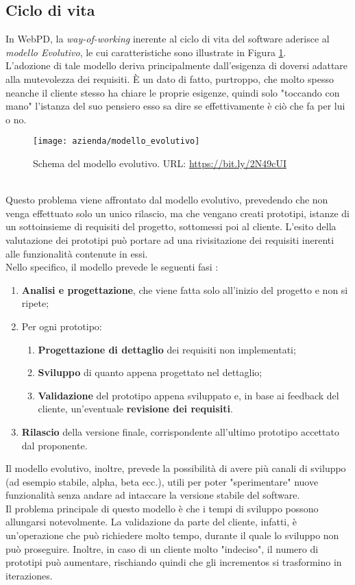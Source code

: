 \subsection{Ciclo di vita}
\label{sec:modello-evolutivo}
In WebPD, la \textit{way-of-working} inerente al ciclo di vita del software aderisce al \textit{modello Evolutivo}, le cui caratteristiche sono illustrate in Figura \ref{figura:modello-evolutivo}.\\
L'adozione di tale modello deriva principalmente dall'esigenza di doversi adattare alla mutevolezza dei requisiti. È un dato di fatto, purtroppo, che molto spesso neanche il cliente stesso ha chiare le proprie esigenze, quindi solo "toccando con mano" l'istanza del suo pensiero esso sa dire se effettivamente è ciò che fa per lui o no.\\
\begin{figure}[!h] 
	\centering 
	\texttt{[image: azienda/modello\_evolutivo]} 
	\caption{Schema del modello evolutivo. URL: \url{https://bit.ly/2N49cUI} }
	\label{figura:modello-evolutivo}
\end{figure}\\
Questo problema viene affrontato dal modello evolutivo, prevedendo che non venga effettuato solo un unico rilascio, ma che vengano creati prototipi, istanze di un sottoinsieme di requisiti del progetto, sottomessi poi al cliente. L'esito della valutazione dei prototipi può portare ad una rivisitazione dei requisiti inerenti alle funzionalità contenute in essi.\\
Nello specifico, il modello prevede le seguenti fasi :
\begin{enumerate}
	\item \textbf{Analisi e progettazione}, che viene fatta solo all'inizio del progetto e non si ripete;
	\item Per ogni prototipo:
		\begin{enumerate}
			\item \textbf{Progettazione di dettaglio} dei requisiti non implementati;
			\item \textbf{Sviluppo} di quanto appena progettato nel dettaglio;
			\item \textbf{Validazione} del prototipo appena sviluppato e, in base ai feedback del cliente, un'eventuale \textbf{revisione dei requisiti}.
		\end{enumerate}
	\item \textbf{Rilascio} della versione finale, corrispondente all'ultimo prototipo accettato dal proponente.
\end{enumerate}
Il modello evolutivo, inoltre, prevede la possibilità di avere più canali di sviluppo (ad esempio stabile, alpha, beta ecc.), utili per poter "sperimentare" nuove funzionalità senza andare ad intaccare la versione stabile del software.\\
Il problema principale di questo modello è che i tempi di sviluppo possono allungarsi notevolmente. La validazione da parte del cliente, infatti, è un'operazione che può richiedere molto tempo, durante il quale lo sviluppo non può proseguire. Inoltre, in caso di un cliente molto "indeciso", il numero di prototipi può aumentare, rischiando quindi che gli \glspl{incremento} si trasformino in \glspl{iterazione}.

